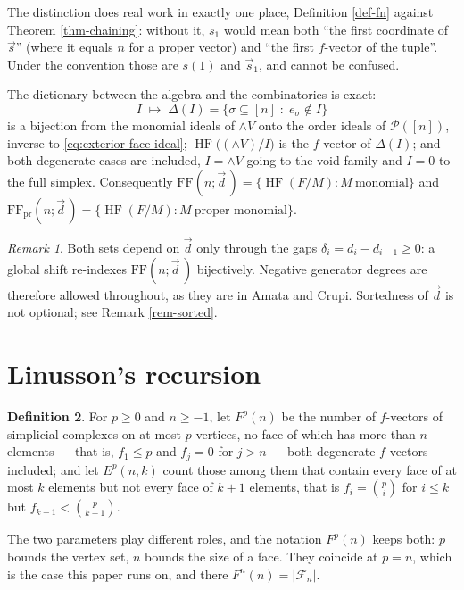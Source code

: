 \documentclass[11pt, a4paper, abstract=yes]{scrartcl}
\theoremstyle{definition}
\newtheorem{definition}{Definition}
\theoremstyle{remark}
\newtheorem{remark}[definition]{Remark}
\theoremstyle{plain}
\newcommand{\HF}{\operatorname{HF}}
\newcommand{\Ext}{\mathord{\wedge }V}
\begin{document}
The distinction does real work in exactly one place, Definition \ref{def-fn} against
Theorem \ref{thm-chaining}: without it, \(s_1\) would mean both ``the first coordinate of \(\vec s\)''
(where it equals \(n\) for a proper vector) and ``the first \(f\)-vector of the tuple''. Under the
convention those are \(s(1)\) and \(\vec s_1\), and cannot be confused.

The dictionary between the algebra and the combinatorics is exact:
\begin{equation}\label{eq:dictionary}
  I\;\longmapsto\;\Delta(I)=\lbrace\sigma\subseteq[n]\;:\;e_\sigma\notin I\rbrace
\end{equation}
is a bijection from the monomial ideals of \(\Ext\) onto the order ideals of \(\mathcal P([n])\), inverse
to \eqref{eq:exterior-face-ideal}; \(\HF\bigl((\Ext)/I\bigr)\) is the \(f\)-vector of \(\Delta(I)\); and both
degenerate cases are included, \(I=\Ext\) going to the void family and \(I=0\) to the full simplex.
Consequently
\(\mathrm{FF}(n;\vec d\,)=\lbrace\HF(F/M):M\ \text{monomial}\rbrace\) and
\(\mathrm{FF}_{\mathrm{pr}}(n;\vec d\,)=\lbrace\HF(F/M):M\ \text{proper monomial}\rbrace\).

\begin{remark}
Both sets depend on \(\vec d\) only through the gaps \(\delta_i=d_i-d_{i-1}\ge0\): a global shift
re-indexes \(\mathrm{FF}(n;\vec d\,)\) bijectively. Negative generator degrees are therefore allowed
throughout, as they are in Amata and Crupi. Sortedness of \(\vec d\) is not optional; see
Remark \ref{rem-sorted}.
\label{rem-shift-only-gaps}
\end{remark}
\section{Linusson's recursion}
\label{sec-linusson}
\begin{definition}
\textcite[\S5]{Linusson1999} For \(p\ge0\) and \(n\ge-1\), let \(F^p(n)\) be the number of
\(f\)-vectors of simplicial complexes on at most \(p\) vertices, no face of which has more than
\(n\) elements — that is, \(f_1\le p\) and \(f_j=0\) for \(j>n\) — both degenerate \(f\)-vectors
included; and let \(E^p(n,k)\) count those among them that contain every face of at most \(k\)
elements but not every face of \(k+1\) elements, that is \(f_i=\binom pi\) for \(i\le k\) but
\(f_{k+1}<\binom p{k+1}\).
\label{def-linusson}
\end{definition}

The two parameters play different roles, and the notation \(F^p(n)\) keeps both: \(p\) bounds the
vertex set, \(n\) bounds the size of a face. They coincide at \(p=n\), which is the case this paper
runs on, and there \(F^n(n)=\lvert\mathcal F_n\rvert\).
\end{document}
